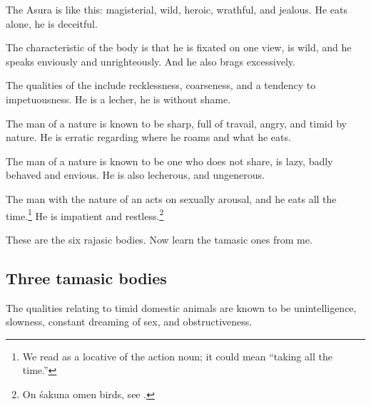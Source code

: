 \begin{translation}
\item[88cd--89ab]
%
The Asura   is like this: 
magisterial, wild, heroic, wrathful, and jealous. 
He eats alone, he is deceitful.
%


\item[91cd--92ab]

The characteristic of the  body %
is that he is fixated on one view, is wild, and he speaks enviously
and unrighteously.  And he also brags excessively.

\item[92cd--93ab]

The qualities of the  include recklessness,
coarseness, and a tendency to impetuousness.  He is a lecher, he is
without shame.

\item[89cd--90ab] 

The man of a  nature is known to be sharp, full of
travail, angry, and timid by nature.  He is erratic regarding
where he roams and what he eats.

\newpage

\item[93cd--94ab]

The man of a  nature is known to be one who does
not share, is lazy, badly behaved and envious.  He is also lecherous,
and ungenerous.  

\item[90cd--91ab]

The man with the nature of an  
acts on sexually arousal, and he eats all the time.\footnote{We read
     as a locative of the action noun; it could mean “taking all the time.”}  He is impatient and restless.\footnote{On śakuna omen birds, see
        \cite[6--8]{zysk-2025}.}
        
\item[94cd]
        
These are the six rajasic bodies.  Now learn the tamasic ones from me.
      

\subsection{Three tamasic bodies}

\item[95]

The qualities relating to timid domestic animals are known to be unintelligence, slowness, constant dreaming of sex, and obstructiveness. 


\end{translation}
